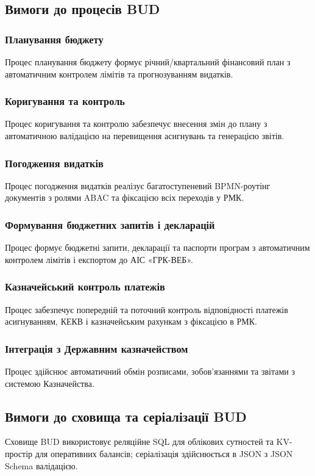 \documentclass{article}
\begin{document}
\newpage
\subsection{Вимоги до процесів BUD}

\subsubsection{Планування бюджету}
Процес планування бюджету формує річний/квартальний фінансовий план з автоматичним контролем лімітів та прогнозуванням видатків.

\subsubsection{Коригування та контроль}
Процес коригування та контролю забезпечує внесення змін до плану з автоматичною валідацією на перевищення асигнувань та генерацією звітів.

\subsubsection{Погодження видатків}
Процес погодження видатків реалізує багатоступеневий BPMN-роутінг документів з ролями ABAC та фіксацією всіх переходів у РМК.

\subsubsection{Формування бюджетних запитів і декларацій}
Процес формує бюджетні запити, декларації та паспорти програм з автоматичним контролем лімітів і експортом до АІС «ГРК-ВЕБ».

\subsubsection{Казначейський контроль платежів}
Процес забезпечує попередній та поточний контроль відповідності платежів асигнуванням, КЕКВ і казначейським рахункам з фіксацією в РМК.

\subsubsection{Інтеграція з Державним казначейством}
Процес здійснює автоматичний обмін розписами, зобов’язаннями та звітами з системою Казначейства.

\subsection{Вимоги до сховища та серіалізації BUD}
Сховище BUD використовує реляційне SQL для облікових сутностей та KV-простір для оперативних балансів; серіалізація здійснюється в JSON з JSON Schema валідацією.
\end{document}
